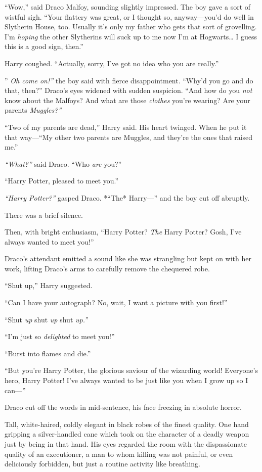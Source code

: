``Wow,'' said Draco Malfoy, sounding slightly impressed. The boy gave a
sort of wistful sigh. ``Your flattery was great, or I thought so,
anyway---you'd do well in Slytherin House, too. Usually it's only my
father who gets that sort of grovelling. I'm \emph{hoping} the other
Slytherins will suck up to me now I'm at Hogwarts\ldots{} I guess this
is a good sign, then.''

Harry coughed. ``Actually, sorry, I've got no idea who you are really.''

'' \emph{Oh come on!''} the boy said with fierce disappointment. ``Why'd
you go and do that, then?'' Draco's eyes widened with sudden suspicion.
``And how do you \emph{not} know about the Malfoys? And what are those
\emph{clothes} you're wearing? Are your parents \emph{Muggles?''}

``Two of my parents are dead,'' Harry said. His heart twinged. When he
put it that way---``My other two parents are Muggles, and they're the
ones that raised me.''

\emph{``What?''} said Draco. ``Who \emph{are} you?''

``Harry Potter, pleased to meet you.''

\emph{``Harry Potter?''} gasped Draco. *``The* Harry---'' and the boy
cut off abruptly.

There was a brief silence.

Then, with bright enthusiasm, ``Harry Potter? \emph{The} Harry Potter?
Gosh, I've always wanted to meet you!''

Draco's attendant emitted a sound like she was strangling but kept on
with her work, lifting Draco's arms to carefully remove the chequered
robe.

``Shut up,'' Harry suggested.

``Can I have your autograph? No, wait, I want a picture with you
first!''

``Shut \emph{up} shut \emph{up} shut \emph{up.''}

``I'm just so \emph{delighted} to meet you!''

``Burst into flames and die.''

``But you're Harry Potter, the glorious saviour of the wizarding world!
Everyone's hero, Harry Potter! I've always wanted to be just like you
when I grow up so I can---''

Draco cut off the words in mid-sentence, his face freezing in absolute
horror.

Tall, white-haired, coldly elegant in black robes of the finest quality.
One hand gripping a silver-handled cane which took on the character of a
deadly weapon just by being in that hand. His eyes regarded the room
with the dispassionate quality of an executioner, a man to whom killing
was not painful, or even deliciously forbidden, but just a routine
activity like breathing.

